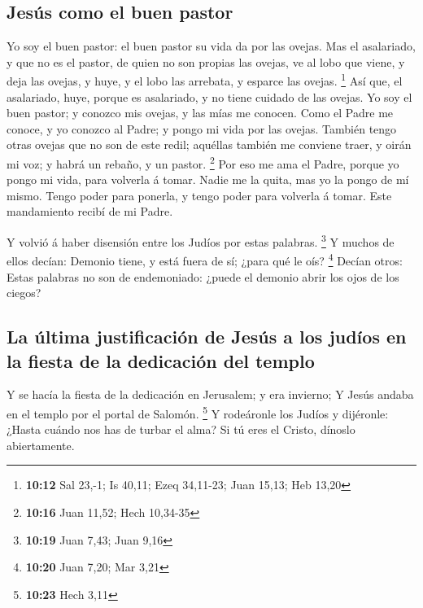 \hypertarget{jesuxfas-como-el-buen-pastor}{%
\subsection{Jesús como el buen
pastor}\label{jesuxfas-como-el-buen-pastor}}

 Yo soy el buen pastor: el buen pastor su vida da por las
ovejas.  Mas el asalariado, y que no es el pastor, de
quien no son propias las ovejas, ve al lobo que viene, y deja las
ovejas, y huye, y el lobo las arrebata, y esparce las ovejas.
\footnote{\textbf{10:12} Sal 23,-1; Is 40,11; Ezeq 34,11-23; Juan 15,13;
  Heb 13,20}  Así que, el asalariado, huye, porque es
asalariado, y no tiene cuidado de las ovejas.  Yo soy el
buen pastor; y conozco mis ovejas, y las mías me conocen.
 Como el Padre me conoce, y yo conozco al Padre; y pongo
mi vida por las ovejas.  También tengo otras ovejas que
no son de este redil; aquéllas también me conviene traer, y oirán mi
voz; y habrá un rebaño, y un pastor. \footnote{\textbf{10:16} Juan
  11,52; Hech 10,34-35}  Por eso me ama el Padre, porque
yo pongo mi vida, para volverla á tomar.  Nadie me la
quita, mas yo la pongo de mí mismo. Tengo poder para ponerla, y tengo
poder para volverla á tomar. Este mandamiento recibí de mi Padre.

 Y volvió á haber disensión entre los Judíos por estas
palabras. \footnote{\textbf{10:19} Juan 7,43; Juan 9,16} 
Y muchos de ellos decían: Demonio tiene, y está fuera de sí; ¿para qué
le oís? \footnote{\textbf{10:20} Juan 7,20; Mar 3,21} 
Decían otros: Estas palabras no son de endemoniado: ¿puede el demonio
abrir los ojos de los ciegos?

\hypertarget{la-uxfaltima-justificaciuxf3n-de-jesuxfas-a-los-juduxedos-en-la-fiesta-de-la-dedicaciuxf3n-del-templo}{%
\subsection{La última justificación de Jesús a los judíos en la fiesta
de la dedicación del
templo}\label{la-uxfaltima-justificaciuxf3n-de-jesuxfas-a-los-juduxedos-en-la-fiesta-de-la-dedicaciuxf3n-del-templo}}

 Y se hacía la fiesta de la dedicación en Jerusalem; y
era invierno;  Y Jesús andaba en el templo por el portal
de Salomón. \footnote{\textbf{10:23} Hech 3,11}  Y
rodeáronle los Judíos y dijéronle: ¿Hasta cuándo nos has de turbar el
alma? Si tú eres el Cristo, dínoslo abiertamente.

